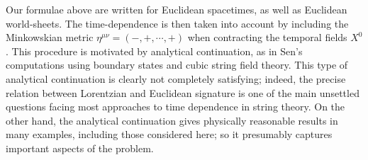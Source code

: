 \documentclass[a4paper,12pt]{article}
\def\p{\partial}
\begin{document}


Our formulae above are written for Euclidean spacetimes, as well as Euclidean world-sheets. 
The time-dependence is then taken into account by including the Minkowskian metric $\eta^{\mu\nu}=(-,+,\cdots,+)$ when contracting
the temporal fields $X^0$. This procedure is motivated by analytical continuation,
as in Sen's computations using boundary states and cubic string field theory.
This type of analytical continuation is clearly not completely satisfying; indeed,
the precise relation between Lorentzian and Euclidean signature is one of the main 
unsettled questions facing most approaches to time dependence in string theory.
On the other hand, the analytical continuation gives physically reasonable results in many examples, including those considered here; so it presumably captures important
aspects of the problem. 
\end{document}
